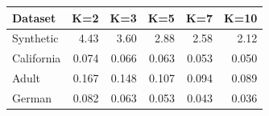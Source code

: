 \begin{tabular}{lrrrrr}
\toprule
Dataset & K=2 & K=3 & K=5 & K=7 & K=10 \\
\midrule
Synthetic & 4.43 & 3.60 & 2.88 & 2.58 & 2.12 \\
California & 0.074 & 0.066 & 0.063 & 0.053 & 0.050 \\
Adult & 0.167 & 0.148 & 0.107 & 0.094 & 0.089 \\
German & 0.082 & 0.063 & 0.053 & 0.043 & 0.036 \\
\bottomrule
\end{tabular}
